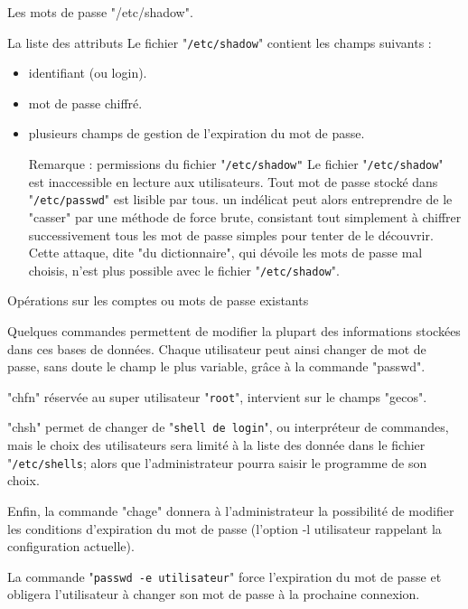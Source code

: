 \documentclass[10pt]{beamer}
\begin{document}
\begin{frame}{Les mots de passe "/etc/shadow".}
\begin{alertblock}{La liste des attributs}
Le fichier "\texttt{/etc/shadow}" contient les champs suivants :
\begin{itemize}
\item identifiant (ou login).
\item mot de passe chiffré.
\item plusieurs champs de gestion de l'expiration du mot de passe.
\pause
\begin{alertblock}{Remarque : permissions du fichier "\texttt{/etc/shadow"}}
Le fichier "\texttt{/etc/shadow}" est inaccessible en lecture aux utilisateurs. 
Tout mot de passe stocké dans "\texttt{/etc/passwd}" est lisible par tous. un indélicat peut alors entreprendre de le "casser" par une méthode de force brute, consistant tout simplement à chiffrer
successivement tous les mot de passe simples pour tenter de le découvrir. Cette attaque, dite "du dictionnaire", qui dévoile les mots de passe mal choisis, n'est plus possible avec le fichier "\texttt{/etc/shadow}".
\end{alertblock}
\end{itemize}
\end{alertblock}
\end{frame}

\begin{frame}{Opérations sur les comptes ou mots de passe existants}

Quelques commandes permettent de modifier la plupart des informations stockées
dans ces bases de données. 
\pause
Chaque utilisateur peut ainsi changer de mot de passe,
sans doute le champ le plus variable, grâce à la commande "\alert{passwd}".
\pause

"\alert{chfn}" réservée au super utilisateur "\texttt{root}", intervient sur le champs "\alert{gecos}".

"\alert{chsh}" permet de changer de "\texttt{shell de login}", ou interpréteur de commandes, mais
le choix des utilisateurs sera limité à la liste des donnée dans le fichier "\texttt{/etc/shells};
alors que l'administrateur pourra saisir le programme de son choix.
\pause

Enfin, la commande "\alert{chage}" donnera à l'administrateur la possibilité de modifier les
conditions d'expiration du mot de passe (l'option -l utilisateur rappelant la configuration actuelle). 
\pause

La commande "\texttt{\alert{passwd} -e utilisateur}" force l'expiration du mot de passe et obligera l'utilisateur à changer son mot de passe à la prochaine connexion.
\end{frame}
\end{document}
